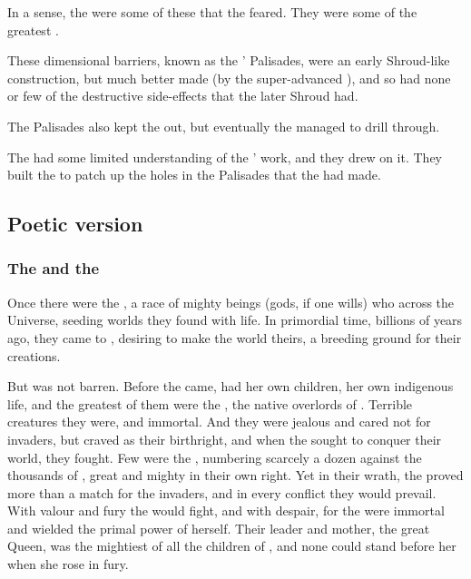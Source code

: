 In a sense, the \xss were some of these  that the \voyagers feared.
They were some of the greatest .

These dimensional barriers, known as the \Voyagers' Palisades, were an early Shroud-like construction, but much better made (by the super-advanced \voyagers), and so had none or few of the destructive side-effects that the later Shroud had.

The Palisades also kept the \banes out, but eventually the \banes managed to drill through.

The \ophidians had some limited understanding of the \voyagers' work, and they drew on it.
They built the  to patch up the holes in the Palisades that the \banes had made.









\subsection{Poetic version}
\subsubsection{The \voyagers{} and the \krakens}
Once there were the \voyagers, a race of mighty beings (gods, if one wills) who \travelled across the Universe, seeding worlds they found with life. In primordial time, billions of years ago, they came to \Miith{}, desiring to make the world theirs, a breeding ground for their creations. 

But \Miith{} was not barren. Before the \voyagers{} came, \Miith{} had her own children, her own indigenous life, and the greatest of them were the \krakens, the native overlords of \Miith{}. Terrible creatures they were, and immortal. And they were jealous and cared not for invaders, but craved \Miith{} as their birthright, and when the \voyagers{} sought to conquer their world, they fought. Few were the \krakens{}, numbering scarcely a dozen against the thousands of \voyagers{}, great and mighty in their own right. Yet in their wrath, the \krakens{} proved more than a match for the invaders, and in every conflict they would prevail. With valour and fury the \voyagers{} would fight, and with despair, for the \krakens{} were immortal and wielded the primal power of \Miith{} herself. Their leader and mother, the great \Kraken{} Queen, was the mightiest of all the children of \Miith{}, and none could stand before her when she rose in fury. 

